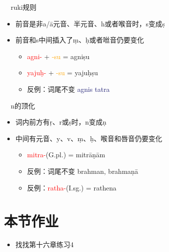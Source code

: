 \documentclass[17pt]{beamer}
\newcommand{\nounstem}[1]{\textcolor{red}{#1\nobreakdash-}}
\newcommand{\wordending}[1]{\textcolor{Orange}{\nobreakdash-#1}}
\newcommand{\fullpada}[1]{\textcolor{OliveGreen}{#1}}
\newcommand{\fullsentence}[1]{\textcolor{MidnightBlue}{#1}}
\begin{document}
\begin{frame}{\insertsubsection ~~ruki规则}
  \begin{itemize}
    \item 前音是非a/ā元音、半元音、h或者喉音时，s变成ṣ
    \item 前音和s中间插入了ṃ、ḥ或者咝音仍要变化
    \begin{itemize}
      \item \nounstem{agni} + \wordending{su} = \fullpada{agniṣu}
      \item \nounstem{yajuḥ} + \wordending{su} = \fullpada{yajuḥṣu}
      \item 反例：词尾不变 \fullsentence{agnis tatra}
    \end{itemize}
  \end{itemize}
\end{frame}

\begin{frame}{\insertsubsection ~~n的顶化}
  \begin{itemize}
    \item 词内前方有ṛ、r或ṣ时，n变成ṇ
    \item 中间有元音、y、v、ṃ、ḥ、喉音和唇音仍要变化
    \begin{itemize}
      \item \nounstem{mitra}(G.pl.) = \fullpada{mitrāṇām}
      \item 反例：词尾不变 \fullpada{brahman}, \fullpada{brahmaṇā}
      \item 反例：\nounstem{ratha}(I.sg.) = \fullpada{rathena}
    \end{itemize}
  \end{itemize}
\end{frame}



\section{本节作业}

\begin{frame}{\insertsection }
  \begin{itemize}
    \item
      找找第十六章练习4
    
  \end{itemize}
\end{frame}  
\end{document}

